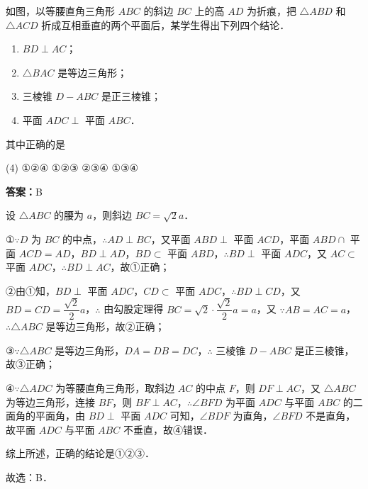 \vspace{2em}


\begin{example}[\bkstar{3}{5}]
如图，以等腰直角三角形 $ABC$ 的斜边 $BC$ 上的高 $AD$ 为折痕，把 $\triangle ABD$ 和 $\triangle ACD$ 折成互相垂直的两个平面后，某学生得出下列四个结论．
\begin{enumerate}
    \item[①] $BD\perp AC$；
    \item[②] $\triangle BAC$ 是等边三角形；
    \item[③] 三棱锥 $D-ABC$ 是正三棱锥；
    \item[④] 平面 $ADC\perp$ 平面 $ABC$．
\end{enumerate}
其中正确的是
\begin{tasks}(4)
    \task ①②④
    \task ①②③
    \task ②③④
    \task ①③④
\end{tasks}
\end{example}
\begin{solution}
\textbf{答案：}B

设 $\triangle ABC$ 的腰为 $a$，则斜边 $BC=\sqrt{2}a$．

①$\because D$ 为 $BC$ 的中点，$\therefore AD\perp BC$，又平面 $ABD\perp$ 平面 $ACD$，平面 $ABD\cap$ 平面 $ACD=AD$，$BD\perp AD$，$BD\subset$ 平面 $ABD$，$\therefore BD\perp$ 平面 $ADC$，又 $AC\subset$ 平面 $ADC$，$\therefore BD\perp AC$，故①正确；

②由①知，$BD\perp$ 平面 $ADC$，$CD\subset$ 平面 $ADC$，$\therefore BD\perp CD$，又 $BD=CD=\dfrac{\sqrt{2}}{2}a$，$\therefore$ 由勾股定理得 $BC=\sqrt{2}\cdot\dfrac{\sqrt{2}}{2}a=a$，又 $\because AB=AC=a$，$\therefore \triangle ABC$ 是等边三角形，故②正确；

③$\because \triangle ABC$ 是等边三角形，$DA=DB=DC$，$\therefore$ 三棱锥 $D-ABC$ 是正三棱锥，故③正确；

④$\because \triangle ADC$ 为等腰直角三角形，取斜边 $AC$ 的中点 $F$，则 $DF\perp AC$，又 $\triangle ABC$ 为等边三角形，连接 $BF$，则 $BF\perp AC$，$\therefore \angle BFD$ 为平面 $ADC$ 与平面 $ABC$ 的二面角的平面角，由 $BD\perp$ 平面 $ADC$ 可知，$\angle BDF$ 为直角，$\angle BFD$ 不是直角，故平面 $ADC$ 与平面 $ABC$ 不垂直，故④错误．

综上所述，正确的结论是①②③．

故选：B．
\end{solution}

\vspace{2em}

